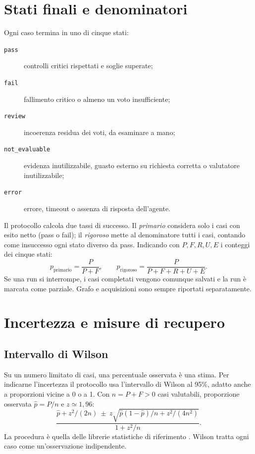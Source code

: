 \section{Stati finali e denominatori}

Ogni caso termina in uno di cinque stati:
\begin{description}
    \item[\texttt{pass}] controlli critici rispettati e soglie superate;
    \item[\texttt{fail}] fallimento critico o almeno un voto insufficiente;
    \item[\texttt{review}] incoerenza residua dei voti, da esaminare a mano;
    \item[\texttt{not\_evaluable}] evidenza inutilizzabile, guasto esterno su
    richiesta corretta o valutatore inutilizzabile;
    \item[\texttt{error}] errore, timeout o assenza di risposta dell'agente.
\end{description}

Il protocollo calcola due tassi di successo. Il \emph{primario} considera solo i
casi con esito netto (pass o fail); il \emph{rigoroso} mette al denominatore
tutti i casi, contando come insuccesso ogni stato diverso da pass. Indicando con
$P,F,R,U,E$ i conteggi dei cinque stati:
\begin{equation}
 p_{\mathrm{primario}}=\frac{P}{P+F}, \qquad
 p_{\mathrm{rigoroso}}=\frac{P}{P+F+R+U+E}.
\label{eq:tassi-judge}
\end{equation}
Se una run si interrompe, i casi completati vengono comunque salvati e la run
è marcata come parziale. Grafo e acquisizioni sono sempre riportati
separatamente.

\section{Incertezza e misure di recupero}

\subsection{Intervallo di Wilson}

Su un numero limitato di casi, una percentuale osservata è una stima. Per
indicarne l'incertezza il protocollo usa l'intervallo di Wilson al 95\%, adatto
anche a proporzioni vicine a 0 o a 1. Con $n=P+F>0$ casi valutabili,
proporzione osservata $\hat p=P/n$ e $z\simeq1{,}96$:
\begin{equation}
 \frac{\hat p+z^2/(2n)\ \pm\
 z\sqrt{\hat p(1-\hat p)/n+z^2/(4n^2)}}{1+z^2/n}.
\label{eq:wilson}
\end{equation}
La procedura è quella delle librerie statistiche di riferimento
\cite{statsmodelsWilson}. Wilson tratta ogni caso come un'osservazione
indipendente.

